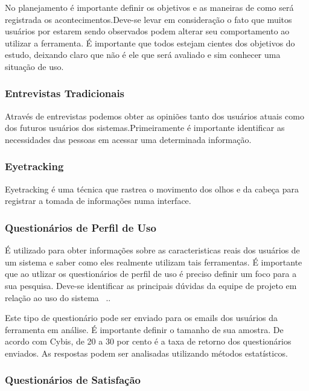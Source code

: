 	No planejamento é importante definir os objetivos e as maneiras de como será registrada os acontecimentos.Deve-se levar em consideração o fato que muitos usuários por estarem sendo observados podem alterar seu comportamento ao utilizar a ferramenta. É importante que todos estejam cientes dos objetivos do estudo, deixando claro que não é ele que será avaliado e sim conhecer uma situação de uso.

\subsubsection{Entrevistas Tradicionais}

Através de entrevistas podemos obter as opiniões tanto dos usuários atuais como dos futuros usuários dos sistemas.Primeiramente é importante identificar as necessidades das pessoas em acessar uma determinada informação.

\subsubsection{Eyetracking}

Eyetracking é uma técnica que rastrea o movimento dos olhos e da cabeça para registrar a tomada de informações numa interface.

\subsubsection{Questionários de Perfil de Uso}
 
É utilizado para obter informações sobre as caracteristicas reais dos usuários de um sistema e saber como eles realmente utilizam tais ferramentas. É importante que ao utlizar os questionários de perfil de uso é preciso definir um foco para a sua pesquisa. Deve-se identificar as principais dúvidas da equipe de projeto em relação ao uso do sistema ~\cite{cybis2010}..

Este tipo de questionário pode ser enviado para os emails dos usuários da ferramenta em análise. É importante definir o tamanho de sua amostra. De acordo com Cybis, de 20 a 30 por cento é a taxa de retorno dos questionários enviados. As respostas podem ser analisadas utilizando métodos estatísticos.


\subsubsection{Questionários de Satisfação}

